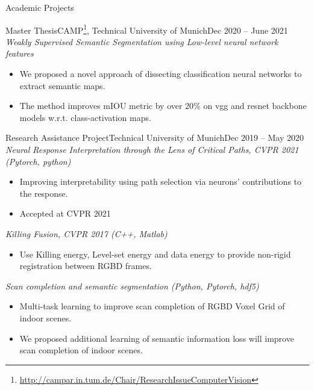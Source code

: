 \documentclass[]{mcdowellcv}
\begin{document}
    \begin{cvsection}{Academic Projects}
    \begin{cvsubsection}[2]{Master Thesis}{CAMP\footnote{\href{http://campar.in.tum.de/Chair/ResearchIssueComputerVision}{http://campar.in.tum.de/Chair/ResearchIssueComputerVision}}, Technical University of Munich}{Dec 2020 -- June 2021}
    \textit{Weakly Supervised Semantic Segmentation using Low-level neural network features}
        \begin{itemize}
            \item We proposed a novel approach of dissecting classification neural networks to extract semantic maps.
            \item The method improves mIOU metric by over 20\% on vgg and resnet backbone models w.r.t. class-activation maps.
        \end{itemize}
    \end{cvsubsection}

    \begin{cvsubsection}{Research Assistance Project}{Technical University of Munich}{Dec 2019 -- May 2020}
    \textit{Neural Response Interpretation through the Lens of Critical Paths, CVPR 2021 (Pytorch, python) \cite{khakzar-2021}}
        \begin{itemize}
        \item Improving interpretability using path selection via
neurons’ contributions to the response.
        \item Accepted at CVPR 2021
        \end{itemize}
    \textit{Killing Fusion, CVPR 2017 (C++, Matlab) \cite{slavcheva2017killingfusion}}
        \begin{itemize}
        \item Use Killing energy, Level-set energy and data energy to provide non-rigid registration between RGBD frames.
        \end{itemize}
    \textit{Scan completion and semantic segmentation (Python, Pytorch, hdf5)}
        \begin{itemize}
        \item Multi-task learning to improve scan completion of RGBD Voxel Grid of indoor scenes.
        \item We proposed additional learning of semantic information loss will improve scan completion of indoor scenes.
        \end{itemize}
    \end{cvsubsection}


\end{cvsection}
\end{document}
